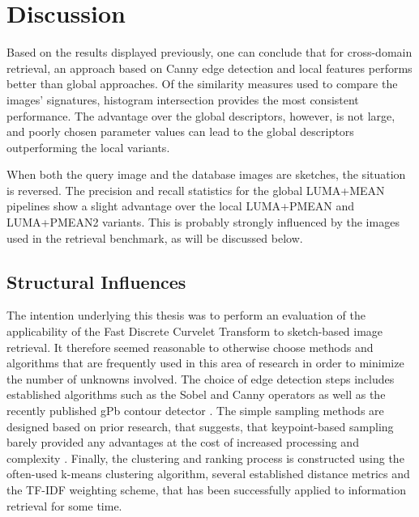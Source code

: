 \chapter{Discussion}\label{ch:discussion}


Based on the results displayed previously, one can conclude that for
cross-domain retrieval, an approach based on Canny edge detection and local
features performs better than global approaches. Of the similarity measures
used to compare the images' signatures, histogram intersection provides the
most consistent performance. 
The advantage over the global descriptors, however, is not large, and poorly
chosen parameter values can lead to the global descriptors outperforming the
local variants.

When both the query image and the database images are sketches, the situation
is reversed. The precision and recall statistics for the global LUMA+MEAN
pipelines show a slight advantage over the local LUMA+PMEAN and LUMA+PMEAN2
variants. This is probably strongly influenced by the images used in the
retrieval benchmark, as will be discussed below.

\section{Structural Influences}

The intention underlying this thesis was to perform an evaluation of the
applicability of the Fast Discrete Curvelet Transform to sketch-based image
retrieval. It therefore seemed reasonable to otherwise choose methods and
algorithms that are frequently used in this area of research in order to
minimize the number of unknowns involved. The choice of edge detection steps
includes established algorithms such as the Sobel and Canny operators as well
as the recently published gPb contour detector
\autocite{arbelaez_contour_2011}. The simple sampling methods are designed
based on prior research, that suggests, that keypoint-based sampling barely
provided any advantages at the cost of increased processing and complexity
\autocite{nowak_sampling_2006}. Finally, the clustering and ranking process is
constructed using the often-used k-means clustering algorithm, several
established distance metrics and the TF-IDF weighting scheme, that has been
successfully applied to information retrieval for some time.

